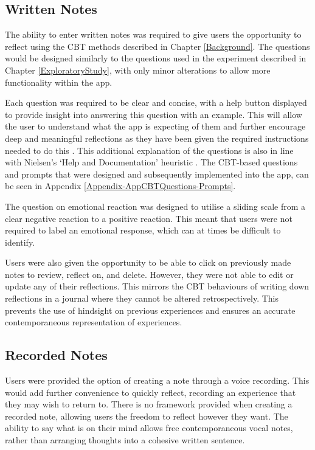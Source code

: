 \documentclass{l4proj}
\begin{document}
\subsection{Written Notes}

The ability to enter written notes was required to give users the opportunity to reflect using the CBT methods described in Chapter \ref{Background}. The questions would be designed similarly to the questions used in the experiment described in Chapter \ref{ExploratoryStudy}, with only minor alterations to allow more functionality within the app. 

Each question was required to be clear and concise, with a help button displayed to provide insight into answering this question with an example. This will allow the user to understand what the app is expecting of them and further encourage deep and meaningful reflections as they have been given the required instructions needed to do this \citep{bruno_reflective_2018}. This additional explanation of the questions is also in line with Nielsen’s ‘Help and Documentation’ heuristic \citep{Nielsen10}. The CBT-based questions and prompts that were designed and subsequently implemented into the app, can be seen in Appendix \ref{Appendix-AppCBTQuestions-Prompts}.

The question on emotional reaction was designed to utilise a sliding scale from a clear negative reaction to a positive reaction. This meant that users were not required to label an emotional response, which can at times be difficult to identify. 

Users were also given the opportunity to be able to click on previously made notes to review, reflect on, and delete. However, they were not able to edit or update any of their reflections. This mirrors the CBT behaviours of writing down reflections in a journal where they cannot be altered retrospectively. This prevents the use of hindsight on previous experiences and ensures an accurate contemporaneous representation of experiences.


\subsection{Recorded Notes}

Users were provided the option of creating a note through a voice recording. This would add further convenience to quickly reflect, recording an experience that they may wish to return to. There is no framework provided when creating a recorded note, allowing users the freedom to reflect however they want. The ability to say what is on their mind allows free contemporaneous vocal notes, rather than arranging thoughts into a cohesive written sentence.
\end{document}
